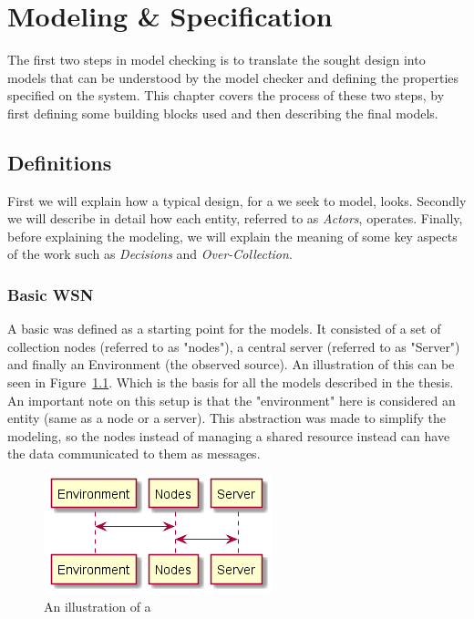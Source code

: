 \chapter{Modeling \& Specification}


The first two steps in model checking is to translate the sought design into models that can be understood by the model checker and defining the properties specified on the system. This chapter covers the process of these two steps, by first defining some building blocks used and then describing the final models.


\section{Definitions}

First we will explain how a typical design, for a \wsn we seek to model, looks. Secondly we will describe in detail how each entity, referred to as \textit{Actors}, operates. Finally, before explaining the modeling, we will explain the meaning of some key aspects of the work such as \textit{Decisions} and \textit{Over-Collection}.

\subsection{Basic WSN}

A basic \wsn was defined as a starting point for the models. It consisted of a set of collection nodes (referred to as "nodes"), a central server (referred to as "Server") and finally an Environment (the observed source). An illustration of this can be seen in Figure~\ref{fig:basic_wsn}. Which is the basis for all the models described in the thesis. An important note on this setup is that the "environment" here is considered an entity (same as a node or a server). This abstraction was made to simplify the modeling, so the nodes instead of managing a shared resource instead can have the data communicated to them as messages.

\begin{figure}[ht]
    \includegraphics{include/figures/basic_wsn}
    \caption{An illustration of a \wsn}
    \label{fig:basic_wsn}
\end{figure}

